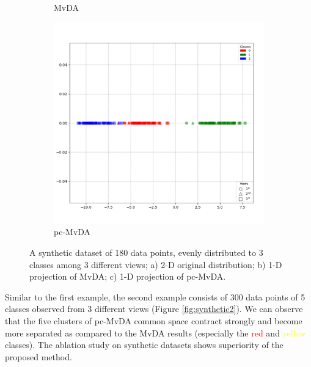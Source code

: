 \begin{figure}[htbp]
\begin{subfigure}{0.33\textwidth}
                \caption{MvDA}
            \end{subfigure}%
            \begin{subfigure}{0.33\textwidth}
                \centering
                \includegraphics[width=0.95\linewidth]{figs/Synthetic1_pc-MvDA.png}
                \caption{pc-MvDA}
            \end{subfigure}

            \caption{A synthetic dataset of 180 data points, evenly distributed to 3 classes among 3 different views; a) 2-D original distribution; b) 1-D projection of MvDA; c) 1-D projection of pc-MvDA.}
            \label{fig:synthetic1}
        \end{figure}

        Similar to the first example, the second example consists of 300 data points of 5 classes observed from 3 different views (Figure \ref{fig:synthetic2}).
        We can observe that the five clusters of pc-MvDA common space contract strongly and become more separated as compared to the MvDA results (especially the \textcolor{red}{red} and \textcolor{yellow}{yellow} classes).
        The ablation study on synthetic datasets shows superiority of the proposed method.

